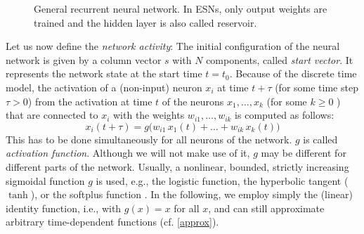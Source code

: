 \documentclass[preprint,12pt,times,authoryear]{elsarticle}%
\theoremstyle{definition}
\begin{document}
\begin{figure}
  \centering
  
  \caption{General recurrent neural network. In ESNs, only output weights are
	trained and the hidden layer is also called reservoir.}
  \label{net}
\end{figure}

Let us now define the \emph{network activity}: The initial
configuration of the neural network is given by a column vector $s$ with $N$
components, called \emph{start vector}. It represents the network state at the
start time $t=t_0$. Because of the discrete time model, the activation
of a (non-input) neuron $x_i$ at time $t+\tau$ (for some time step $\tau>0$) from
the activation at time $t$ of the neurons $x_1,\dots,x_k$ (for some $k \ge 0$ ) that
are connected to $x_i$ with the weights $w_{i1},\dots,w_{ik}$ is computed as
follows:
\begin{equation}\label{recur}
	x_i(t+\tau) = g\big(w_{i1}\,x_1(t) +\dots+ w_{ik}\,x_k(t)\big)
\end{equation}
This has to be done simultaneously for all neurons of the network. $g$ is called
\emph{activation function}. Although we will not make use of it,
$g$ may be different for different parts of the network.
Usually, a nonlinear, bounded, strictly increasing sigmoidal function $g$ is
used, e.g., the logistic function, the hyperbolic tangent ($\tanh$), or the
softplus function \citep[Sect.~3.10]{GBC16}. In the following, we employ simply
the (linear) identity function, i.e., with $g(x)=x$ for all $x$, and can still
approximate arbitrary time-dependent functions (cf. \cref{approx}).
\end{document}
